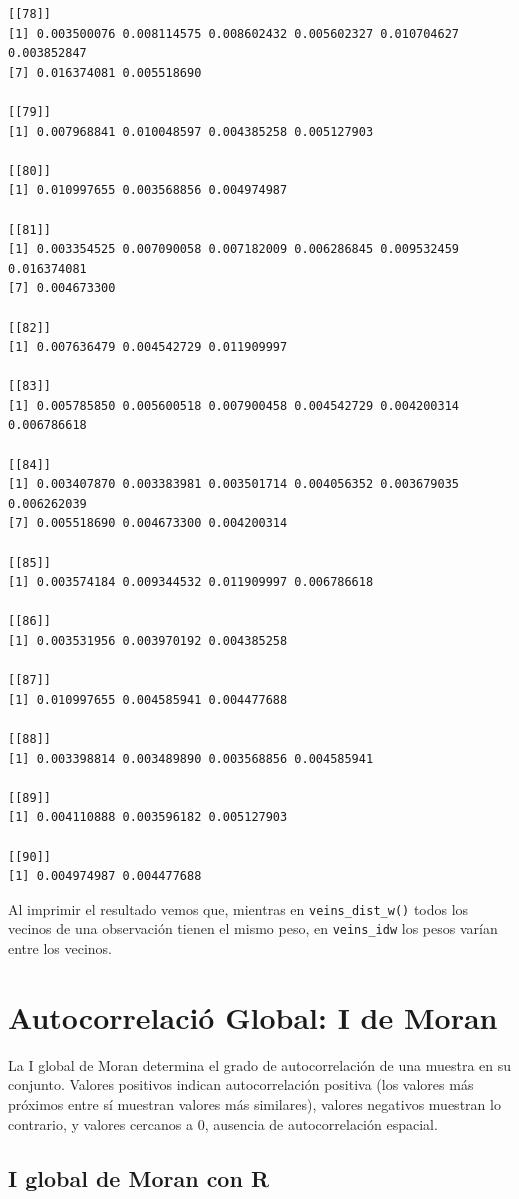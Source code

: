 \documentclass[
  letterpaper,
  DIV=11,
  numbers=noendperiod]{scrreprt}
\begin{document}
\begin{verbatim}
[[78]]
[1] 0.003500076 0.008114575 0.008602432 0.005602327 0.010704627 0.003852847
[7] 0.016374081 0.005518690

[[79]]
[1] 0.007968841 0.010048597 0.004385258 0.005127903

[[80]]
[1] 0.010997655 0.003568856 0.004974987

[[81]]
[1] 0.003354525 0.007090058 0.007182009 0.006286845 0.009532459 0.016374081
[7] 0.004673300

[[82]]
[1] 0.007636479 0.004542729 0.011909997

[[83]]
[1] 0.005785850 0.005600518 0.007900458 0.004542729 0.004200314 0.006786618

[[84]]
[1] 0.003407870 0.003383981 0.003501714 0.004056352 0.003679035 0.006262039
[7] 0.005518690 0.004673300 0.004200314

[[85]]
[1] 0.003574184 0.009344532 0.011909997 0.006786618

[[86]]
[1] 0.003531956 0.003970192 0.004385258

[[87]]
[1] 0.010997655 0.004585941 0.004477688

[[88]]
[1] 0.003398814 0.003489890 0.003568856 0.004585941

[[89]]
[1] 0.004110888 0.003596182 0.005127903

[[90]]
[1] 0.004974987 0.004477688
\end{verbatim}

Al imprimir el resultado vemos que, mientras en
\texttt{veins\_dist\_w()} todos los vecinos de una observación tienen el
mismo peso, en \texttt{veins\_idw} los pesos varían entre los vecinos.

\hypertarget{autocorrelaciuxf3-global-i-de-moran}{%
\section{Autocorrelació Global: I de
Moran}\label{autocorrelaciuxf3-global-i-de-moran}}

La I global de Moran determina el grado de autocorrelación de una
muestra en su conjunto. Valores positivos indican autocorrelación
positiva (los valores más próximos entre sí muestran valores más
similares), valores negativos muestran lo contrario, y valores cercanos
a 0, ausencia de autocorrelación espacial.

\hypertarget{i-global-de-moran-con-r}{%
\subsection{I global de Moran con R}\label{i-global-de-moran-con-r}}
\end{document}
